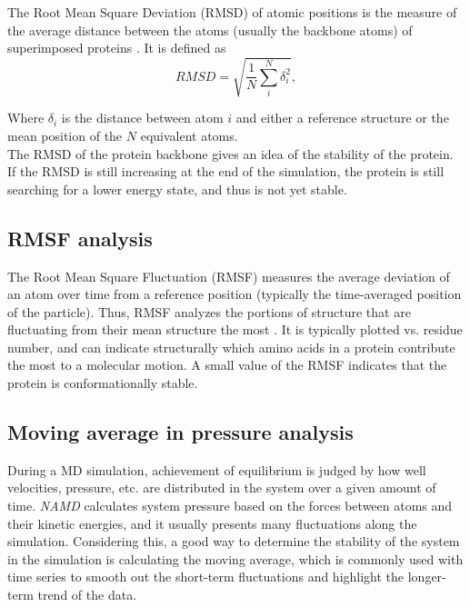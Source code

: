 \documentclass[paper=letter, onecolum, fontsize=12pt]{article}
\begin{document}
\hspace{4mm}The Root Mean Square Deviation (RMSD) of atomic positions is the measure of the average distance between the atoms (usually the backbone atoms) of superimposed proteins \cite{kufareva_methods_2011}. It is defined as 
\begin{equation*}
    RMSD=\sqrt{\frac{1}{N}\sum_i^N \delta_i^2},
\end{equation*}

Where $\delta_i$ is the distance between atom $i$ and either a reference structure or the mean position of the $N$ equivalent atoms.\\

The RMSD of the protein backbone gives an idea of the stability of the protein. If the RMSD is still increasing at the end of the simulation, the protein is still searching for a lower energy state, and thus is not yet stable.

\subsection{RMSF analysis}

\hspace{4mm}The Root Mean Square Fluctuation (RMSF) measures the average deviation of an atom over time from a reference position (typically the time-averaged position of the particle). Thus, RMSF analyzes the portions of structure that are fluctuating from their mean structure the most \cite{kufareva_methods_2011}. It is typically plotted vs. residue number, and can indicate structurally which amino acids in a protein contribute the most to a molecular motion. A small value of the RMSF indicates that the protein is conformationally stable.

\subsection{Moving average in pressure analysis}

\hspace{4mm} During a MD simulation, achievement of equilibrium is judged by how well velocities, pressure, etc. are distributed in the system over a given amount of time. \textit{NAMD} calculates system pressure based on
the forces between atoms and their kinetic energies, and it usually presents many fluctuations along the simulation. Considering this, a good way to determine the stability of the system in the simulation is calculating the moving average, which is commonly used with time series to smooth out the short-term fluctuations and highlight the longer-term trend of the data.
\end{document}
